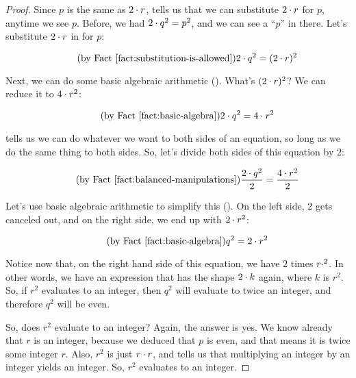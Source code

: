 \documentclass[../../../main.tex]{subfiles}
\begin{document}
\begin{proof}
Since $p$ is the same as $2 \mult/ r$,  tells us that we can substitute $2 \mult/ r$ for $p$, anytime we see $p$. Before, we had $2 \mult/ q^{2} = p^{2}$, and we can see a ``$p$'' in there. Let's substitute $2 \mult/ r$ in for $p$:

\begin{equation*}
  \tag{by \factref{fact:substitution-is-allowed}}
  2 \mult/ q^{2} = (2 \mult/ r)^{2}
\end{equation*}

Next, we can do some basic algebraic arithmetic (). What's $(2 \mult/ r)^{2}$? We can reduce it to $4 \mult/ r^{2}$:

\begin{equation*}
  \tag{by \factref{fact:basic-algebra}}
  2 \mult/ q^{2} = 4 \mult/ r^{2}
\end{equation*}

 tells us we can do whatever we want to both sides of an equation, so long as we do the same thing to both sides. So, let's divide both sides of this equation by 2:

\begin{equation*}
  \tag{by \factref{fact:balanced-manipulations}}
  \frac{2 \mult/ q^{2}}{2} = \frac{4 \mult/ r^{2}}{2}
\end{equation*}

Let's use basic algebraic arithmetic to simplify this (). On the left side, $2$ gets canceled out, and on the right side, we end up with $2 \mult/ r^{2}$:

\begin{equation*}
  \tag{by \factref{fact:basic-algebra}}
  q^{2} = 2 \mult/ r^{2}
\end{equation*}

Notice now that, on the right hand side of this equation, we have $2$ times $r \mult/ ^{2}$. In other words, we have an expression that has the shape $2 \mult/ k$ again, where $k$ is $r^{2}$. So, if $r^{2}$ evaluates to an integer, then $q^{2}$ will evaluate to twice an integer, and therefore $q^{2}$ will be even. 

So, does $r^{2}$ evaluate to an integer? Again, the answer is yes. We know already that $r$ is an integer, because we deduced that $p$ is even, and that means it is twice some integer $r$. Also, $r^{2}$ is just $r \mult/ r$, and  tells us that multiplying an integer by an integer yields an integer. So, $r^{2}$ evaluates to an integer. 


\end{proof}
\end{document}
